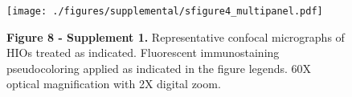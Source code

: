 \documentclass[9pt,lineo]{elife}
\date{\today}
\title{}
\begin{document}
\begin{figure}
\begin{fullwidth}
\centering\texttt{[image: ./figures/supplemental/sfigure4\_multipanel.pdf]}
\caption*{\textbf{Figure 8 - Supplement 1. }Representative confocal micrographs of HIOs treated as indicated. Fluorescent immunostaining pseudocoloring applied as indicated in the figure legends. 60X optical magnification with 2X digital zoom.}
\label{fig:fullwidth}
\end{fullwidth}
\end{figure}
\end{document}
